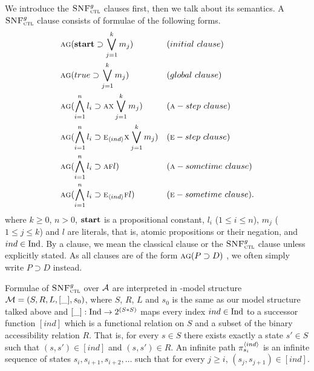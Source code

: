 \documentclass{article}
\begin{document}
We introduce the ${\textsc{SNF}_{\textsc{ctl}}^g}$ clauses first, then we talk about its semantics. A ${\textsc{SNF}_{\textsc{ctl}}^g}$ clause consists of formulae of the following forms.
\begin{align*}
& \ALL \GLOBAL(\start \supset \bigvee_{j=1}^k m_j) && (initial\ clause) \\
& \ALL \GLOBAL(true \supset \bigvee_{j=1}^k m_j) && (global\ clause) \\
& \ALL \GLOBAL(\bigwedge_{i=1}^n l_i \supset \ALL \NEXT \bigvee_{j=1}^k m_j) && (\ALL-step\ clause)\\
& \ALL \GLOBAL(\bigwedge_{i=1}^n l_i \supset \EXIST_\tuple{ind} \NEXT \bigvee_{j=1}^k m_j) && (\EXIST-step\ clause)\\
& \ALL \GLOBAL(\bigwedge_{i=1}^n l_i \supset \ALL \FUTURE l) && (\ALL-sometime\ clause)\\
& \ALL \GLOBAL(\bigwedge_{i=1}^n l_i \supset \EXIST_{\tuple{ind}} \FUTURE l) && (\EXIST-sometime\ clause).
\end{align*}
where $k \ge 0$, $n > 0$, $\textbf{start}$ is a propositional constant, $l_i$ ($1 \le i \le n$), $m_j$ ($1 \le j \le k$) and $l$ are literals, that is, atomic propositions or their negation, and $ind\in \textrm{Ind}$. %
By a clause, we mean the classical clause or the ${\textsc{SNF}_{\textsc{ctl}}^g}$ clause unless explicitly stated.
As all clauses are of the form $\textsc{a} \textsc{g}(P \supset D)$ , we often simply write $P \supset D$ instead.

Formulae of ${\textsc{SNF}_{\textsc{ctl}}^g}$ over ${\cal A}$ are interpreted in \Ind-model structure ${\cal M}=(S,R,L, [\_], s_0)$, where $S$, $R$, $L$ and $s_0$ is the same as our model structure talked above and $[\_]: \textrm{Ind} \rightarrow 2^{(S*S)}$ maps every index $ind \in \textrm{Ind}$ to a successor function $[ind]$ which is a functional relation on $S$ and a subset of the binary accessibility relation $R$. That is, for every $s\in S$ there exists exactly a state $s'\in S$ such that $(s,s')\in [ind]$ and $(s,s')\in R$.
An infinite path $\pi_{s_i}^{{\langle{ind}\rangle}}$ is an infinite sequence of states $s_i, s_{i+1}, s_{i+2},\dots$ such that for every $j\geq i$, $(s_j, s_{j+1})\in [ind]$.
\end{document}
